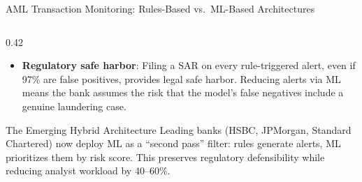 \begin{frame}{AML Transaction Monitoring: Rules-Based vs.\ ML-Based Architectures}
\begin{columns}[T]
\begin{column}{0.42\textwidth}
\begin{itemize}
        \item \textbf{Regulatory safe harbor}: Filing a SAR on every rule-triggered alert, even if 97\% are false positives, provides legal safe harbor. Reducing alerts via ML means the bank assumes the risk that the model's false negatives include a genuine laundering case.
      \end{itemize}
      \vspace{0.2em}
      \begin{exampleblock}{The Emerging Hybrid Architecture}
        Leading banks (HSBC, JPMorgan, Standard Chartered) now deploy ML as a ``second pass'' filter: rules generate alerts, ML prioritizes them by risk score. This preserves regulatory defensibility while reducing analyst workload by 40--60\%.
      \end{exampleblock}
    \end{column}
  \end{columns}
\end{frame}



